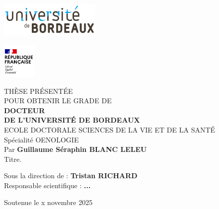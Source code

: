 
\pagestyle{empty}


\includegraphics[scale=1, height=1.7cm]{0_Liminaires/Images/UBX_logo.png}
\hfill

\includegraphics[scale=1, height=1.7cm]{0_Liminaires/Images/RF.png} %
\hfill

\vspace{0.5cm}

\begin{center}
\linespread{1.6}\selectfont %
\begin{Large}
THÈSE PRÉSENTÉE\\
POUR OBTENIR LE GRADE DE \\
{\LARGE \textbf{DOCTEUR\\DE L'UNIVERSITÉ DE BORDEAUX}}\\
\vspace{0.55cm}
ECOLE DOCTORALE SCIENCES DE LA VIE ET DE LA SANTÉ\\
{\normalsize Spécialité OENOLOGIE} \\
\vspace{0.55cm}
Par \textbf{Guillaume Séraphin BLANC LELEU} \\
\vspace{0.55cm}
{\Large Titre.}
\end{Large}

\vspace{0.55cm}

\linespread{1.05}\selectfont
{\normalsize
Sous la direction de : \textbf{Tristan RICHARD}\\
Responsable scientifique : \textbf{...}
}
\end{center}

\vfill

\begin{center}
{\large Soutenue le x novembre 2025 }\\    
\end{center}

